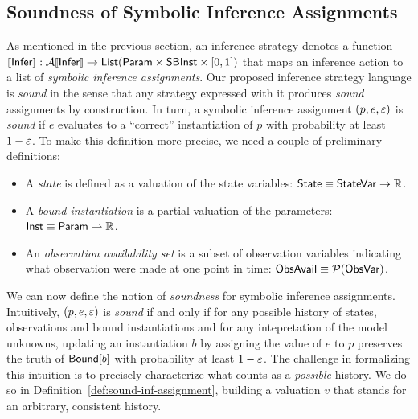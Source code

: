 \documentclass[acmsmall,screen,nonacm]{acmart}
\begin{document}


\subsection{Soundness of Symbolic Inference Assignments}

As mentioned in the previous section, an inference strategy denotes a function $\sem{\Inference} : \InfActionSem{\Inference} \to \List{\Param \times \SymbBoundExpr \times \EpsType}$ that maps an inference action to a list of \emph{symbolic inference assignments}. Our proposed inference strategy language is \emph{sound} in the sense that any strategy expressed with it produces \emph{sound} assignments by construction. In turn, a symbolic inference assignment $(p, e, \varepsilon)$ is \emph{sound} if $e$ evaluates to a ``correct'' instantiation of $p$ with probability at least $1-\varepsilon$. To make this definition more precise, we need a couple of preliminary definitions:
\begin{itemize}
  \item A \emph{state} is defined as a valuation of the state variables: $\mathsf{State} \equiv \mathsf{StateVar} \to \mathbb{R}$.
  \item A \emph{bound instantiation} is a partial valuation of the parameters: $\mathsf{Inst} \equiv \mathsf{Param} \rightharpoonup \mathbb{R}$.
  \item An \emph{observation availability set} is a subset of observation variables indicating what observation were made at one point in time: $\mathsf{ObsAvail} \equiv \mathcal{P}(\mathsf{ObsVar})$.
\end{itemize}
We can now define the notion of \emph{soundness} for symbolic inference assignments. Intuitively, $(p, e, \varepsilon)$ is \emph{sound} if and only if for any possible history of states, observations and bound instantiations and for any intepretation of the model unknowns, updating an instantiation $b$ by assigning the value of $e$ to $p$ preserves the truth of $\mathsf{Bound}[b]$ with probability at least $1-\varepsilon$. The challenge in formalizing this intuition is to precisely characterize what counts as a \emph{possible} history. We do so in Definition~\ref{def:sound-inf-assignment}, building a valuation $v$ that stands for an arbitrary, consistent history.
\end{document}
